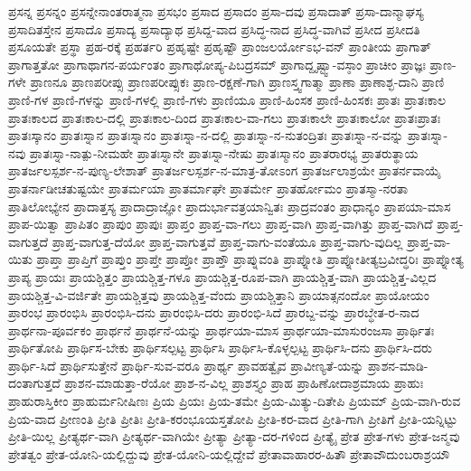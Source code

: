 {ಪ್ರಸನ್ನ
ಪ್ರಸನ್ನಂ
ಪ್ರಸನ್ನೇನಾಂತರಾತ್ಮನಾ
ಪ್ರಸಭಂ
ಪ್ರಸಾದ
ಪ್ರಸಾದಂ
ಪ್ರಸಾ-ದವು
ಪ್ರಸಾದಾತ್
ಪ್ರಸಾ-ದಾನ್ಮಾಘಸ್ಯ
ಪ್ರಸಾದಿತಸ್ತೇನ
ಪ್ರಸಾದೊ
ಪ್ರಸಾದ್ಯ
ಪ್ರಸಾದ್ಯಾಥ
ಪ್ರಸಿದ್ದ-ವಾದ
ಪ್ರಸಿದ್ಧ-ನಾದ
ಪ್ರಸಿದ್ಧ-ವಾಗಿವೆ
ಪ್ರಸೀದ
ಪ್ರಸೀದತಿ
ಪ್ರಸೂಯತೇ
ಪ್ರಸ್ಥಾ
ಪ್ರಹ-ರಕ್ಕೆ
ಪ್ರಹರ್ತರಿ
ಪ್ರಹೃಷ್ಟೇ
ಪ್ರಹೃಷ್ಟೌ
ಪ್ರಾಂಜಲರ್ಯೋಽಭ-ವನ್
ಪ್ರಾಂತೀಯ
ಪ್ರಾಗಾತ್
ಪ್ರಾಗಾತ್ತತೋ
ಪ್ರಾಗಾಥಾಗನ-ಪರ್ಯಂತಂ
ಪ್ರಾಗಾಥೋಪ್ಯ-ಪಿಬದ್ರಸಮ್
ಪ್ರಾಗಾದ್ದೃಷ್ಟ್ವಾ-ವಸ್ಠಾಂ
ಪ್ರಾಚೀಂ
ಪ್ರಾಜ್ಞಃ
ಪ್ರಾಣ-ಗಳೇ
ಪ್ರಾಣನೂ
ಪ್ರಾಣಪರೀಪ್ಸು
ಪ್ರಾಣಪರೀಪ್ಸುಕಃ
ಪ್ರಾಣ-ರಕ್ಷಣೆ-ಗಾಗಿ
ಪ್ರಾಣಸ್ತ್ವಗಾತ್ಮಾ
ಪ್ರಾಣಾ
ಪ್ರಾಣಾಶ್ಛ-ದಾನಿ
ಪ್ರಾಣಿ
ಪ್ರಾಣಿ-ಗಳ
ಪ್ರಾಣಿ-ಗಳನ್ನು
ಪ್ರಾಣಿ-ಗಳಲ್ಲಿ
ಪ್ರಾಣಿ-ಗಳು
ಪ್ರಾಣಿಯೂ
ಪ್ರಾಣಿ-ಹಿಂಸಕ
ಪ್ರಾಣಿ-ಹಿಂಸಕಃ
ಪ್ರಾತಃ
ಪ್ರಾತಃಕಾಲ
ಪ್ರಾತಃಕಾಲದ
ಪ್ರಾತಃಕಾಲ-ದಲ್ಲಿ
ಪ್ರಾತಃಕಾಲ-ದಿಂದ
ಪ್ರಾತಃಕಾಲ-ವಾ-ಗಲು
ಪ್ರಾತಃಕಾಲೇ
ಪ್ರಾತಃಕಾಲೋ
ಪ್ರಾತಃಪ್ರಾತಃ
ಪ್ರಾತಃಸ್ಕಾನಂ
ಪ್ರಾತಃಸ್ನಾನ
ಪ್ರಾತಃಸ್ನಾನಂ
ಪ್ರಾತಃಸ್ನಾ-ನ-ದಲ್ಲಿ
ಪ್ರಾತಃಸ್ನಾ-ನ-ನುತಂದ್ರಿತಃ
ಪ್ರಾತಃಸ್ನಾ-ನ-ವನ್ನು
ಪ್ರಾತಃಸ್ನಾ-ನವು
ಪ್ರಾತಃಸ್ನಾ-ನಾತ್ಪು-ನೀಮಹೇ
ಪ್ರಾತಃಸ್ನಾನೇ
ಪ್ರಾತಃಸ್ನಾ-ನೇಷು
ಪ್ರಾತಃಸ್ಮಾನಂ
ಪ್ರಾತರಾರಭ್ಯ
ಪ್ರಾತರುತ್ಥಾಯ
ಪ್ರಾತರ್ಜಲಸ್ಪರ್ಶ-ನ-ಪುಣ್ಯ-ಲೇಶಾತ್
ಪ್ರಾತರ್ಜಲಸ್ಪರ್ಶ-ನ-ಮಾತ್ರ-ತೋಽಂಗ
ಪ್ರಾತರ್ಜಲಾಶ್ರಯೇ
ಪ್ರಾತರ್ನವಾಯೈ
ಪ್ರಾತರ್ನಾಡೀಚತುಷ್ಟಯೇ
ಪ್ರಾತರ್ಮಯಾ
ಪ್ರಾತರ್ಮಾಘೇ
ಪ್ರಾತರ್ಮೇ
ಪ್ರಾತರ್ಹೋಮಂ
ಪ್ರಾತಸ್ಮಾ-ನರತಾ
ಪ್ರಾತಿಲೋಭ್ಯೇನ
ಪ್ರಾದಾತ್ತಸ್ಯ
ಪ್ರಾದಾದ್ರಾಜ್ಞೋ
ಪ್ರಾದುರ್ಭಾವತ್ರಯಾನ್ವಿತಃ
ಪ್ರಾದ್ರವಂತಂ
ಪ್ರಾಧಾನ್ಯಂ
ಪ್ರಾಪಯಾ-ಮಾಸ
ಪ್ರಾಪ-ಯಿತ್ವಾ
ಪ್ರಾಪಿತಂ
ಪ್ರಾಪುಂ
ಪ್ರಾಪುಃ
ಪ್ರಾಪ್ತಂ
ಪ್ರಾಪ್ತ-ವಾ-ಗಲು
ಪ್ರಾಪ್ತ-ವಾಗಿ
ಪ್ರಾಪ್ತ-ವಾಗಿತ್ತು
ಪ್ರಾಪ್ತ-ವಾಗಿದೆ
ಪ್ರಾಪ್ತ-ವಾಗುತ್ತದೆ
ಪ್ರಾಪ್ತ-ವಾಗುತ್ತ-ದೆಯೋ
ಪ್ರಾಪ್ತ-ವಾಗುತ್ತವೆ
ಪ್ರಾಪ್ತ-ವಾಗು-ವಂತೆಯೂ
ಪ್ರಾಪ್ತ-ವಾಗು-ವುದಿಲ್ಲ
ಪ್ರಾಪ್ತ-ವಾ-ಯಿತು
ಪ್ರಾಪ್ತಾ
ಪ್ರಾಪ್ತಿಗೆ
ಪ್ರಾಪ್ತುಂ
ಪ್ರಾಪ್ತೇ
ಪ್ರಾಪ್ತೋ
ಪ್ರಾಪ್ತೌ
ಪ್ರಾಪ್ನುವಂತಿ
ಪ್ರಾಪ್ನೋತಿ
ಪ್ರಾಪ್ನೋತೀತ್ಯಬ್ರವೀದ್ಧರಿಃ
ಪ್ರಾಪ್ನೋತ್ಯ
ಪ್ರಾಪ್ಯ
ಪ್ರಾಯಃ
ಪ್ರಾಯಶ್ಚಿತ್ತಂ
ಪ್ರಾಯಶ್ಚಿತ್ತ-ಗಳೂ
ಪ್ರಾಯಶ್ಚಿತ್ತ-ರೂಪ-ವಾಗಿ
ಪ್ರಾಯಶ್ಚಿತ್ತ-ವಾಗಿ
ಪ್ರಾಯಶ್ಚಿತ್ತ-ವಿಲ್ಲದ
ಪ್ರಾಯಶ್ಚಿತ್ತ-ವಿ-ವರ್ಜಿತೇ
ಪ್ರಾಯಶ್ಚಿತ್ತವು
ಪ್ರಾಯಶ್ಚಿತ್ತ-ವೆಂದು
ಪ್ರಾಯಶ್ಚಿತ್ತಾನಿ
ಪ್ರಾಯಾತ್ಸನಂದೋ
ಪ್ರಾಯೋಯಂ
ಪ್ರಾರಂಭ
ಪ್ರಾರಂಭಿಸಿ
ಪ್ರಾರಂಭಿಸಿ-ದನು
ಪ್ರಾರಂಭಿಸಿ-ದರು
ಪ್ರಾರಂಭಿ-ಸಿದೆ
ಪ್ರಾರಬ್ದ-ವನ್ನು
ಪ್ರಾರಬ್ಧೇತ-ರ-ನಾದ
ಪ್ರಾರ್ಥನಾ-ಪೂರ್ವಕಂ
ಪ್ರಾರ್ಥನೆ
ಪ್ರಾರ್ಥನೆ-ಯನ್ನು
ಪ್ರಾರ್ಥಯಾ-ಮಾಸ
ಪ್ರಾರ್ಥಯಾ-ಮಾಸುರಂಜಸಾ
ಪ್ರಾರ್ಥಿತಃ
ಪ್ರಾರ್ಥಿತೋಪಿ
ಪ್ರಾರ್ಥಿಸ-ಬೇಕು
ಪ್ರಾರ್ಥಿಸಲ್ಪಟ್ಟ
ಪ್ರಾರ್ಥಿಸಿ
ಪ್ರಾರ್ಥಿಸಿ-ಕೊಳ್ಳಲ್ಪಟ್ಟ
ಪ್ರಾರ್ಥಿಸಿ-ದನು
ಪ್ರಾರ್ಥಿಸಿ-ದರು
ಪ್ರಾರ್ಥಿ-ಸಿದೆ
ಪ್ರಾರ್ಥಿಸುತ್ತೇನೆ
ಪ್ರಾರ್ಥಿ-ಸುವ-ವರೂ
ಪ್ರಾರ್ಥ್ಯ
ಪ್ರಾವಹತ್ವೈವ
ಪ್ರಾವೀಣ್ಯತೆ-ಯನ್ನು
ಪ್ರಾಶನ-ಮಾಡಿ-ದಂತಾಗುತ್ತದೆ
ಪ್ರಾಶನ-ಮಾಡುತ್ತಾ-ರೆಯೋ
ಪ್ರಾಶ-ನ-ವಿಲ್ಲ
ಪ್ರಾಶಸ್ತ್ಯಂ
ಪ್ರಾಹ
ಪ್ರಾಹಿಣೋದಾಶ್ರಮಾಯ
ಪ್ರಾಹುಃ
ಪ್ರಾಹುರಾಸ್ತಿಕೀಂ
ಪ್ರಾಹುರ್ಮನೀಷಿಣಃ
ಪ್ರಿಯ
ಪ್ರಿಯಃ
ಪ್ರಿಯ-ತಮೇ
ಪ್ರಿಯ-ಮಿತ್ಯು-ದಿತೇಪಿ
ಪ್ರಿಯಮ್
ಪ್ರಿಯ-ವಾಗಿ-ರುವ
ಪ್ರಿಯ-ವಾದ
ಪ್ರೀಣಂತಿ
ಪ್ರೀತಿ
ಪ್ರೀತಿಃ
ಪ್ರೀತಿ-ಕರಂಭೂಯಸ್ತತೋಪಿ
ಪ್ರೀತಿ-ಕರ-ವಾದ
ಪ್ರೀತಿ-ಗಾಗಿ
ಪ್ರೀತಿಗೆ
ಪ್ರೀತಿ-ಯನ್ನಿಟ್ಟು
ಪ್ರೀತಿ-ಯಿಲ್ಲ
ಪ್ರೀತ್ಯರ್ಥ-ವಾಗಿ
ಪ್ರೀತ್ಯರ್ಥ-ವಾಗಿಯೇ
ಪ್ರೀತ್ಯಾ
ಪ್ರೀತ್ಯಾ-ದರ-ಗಳಿಂದ
ಪ್ರೀತ್ಯೈ
ಪ್ರೇತ
ಪ್ರೇತ-ಗಳು
ಪ್ರೇತ-ಜನ್ಮವು
ಪ್ರೇತತ್ವಂ
ಪ್ರೇತ-ಯೋನಿ-ಯಲ್ಲಿದ್ದುವು
ಪ್ರೇತ-ಯೋನಿ-ಯಲ್ಲಿದ್ದೇವೆ
ಪ್ರೇತಾವಾಹಾರರ-ಹಿತೌ
ಪ್ರೇತಾವೌದುಂಬರಾಶ್ರಯೌ
}
